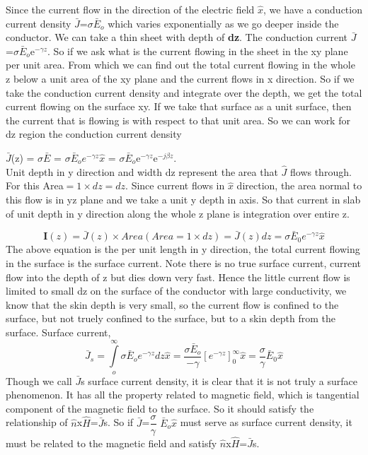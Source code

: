 Since the current flow in the direction of the electric field $\hat{x}$, we have a conduction current density $\bar{J}$=$\sigma\bar{E}_o$ which varies exponentially as we go deeper inside the conductor. We can take a thin sheet with depth of \textbf{dz}. The conduction current $\bar{J}$=$\sigma\bar{E}_o$e$^{-\gamma z}$. So if we ask what is the current flowing in the sheet in the xy plane per unit area. From which we can find out the total current flowing in the whole z below a unit area of the xy plane and the current flows in x direction. So if we take the conduction current density and integrate over the depth, we get the total current flowing on the surface xy. If we take that surface as a unit surface, then the current that is flowing is with respect to that unit area. So we can work for dz region the conduction current density

$\bar{J}$(z) = $\sigma$$\bar{E}$ = $\sigma\bar{E}_oe^{-\gamma z} \hat{x}$ = $\sigma\bar{E}_o$e$^{-\gamma z}$e$^{-j\beta z}$.\\
Unit depth in y direction and width dz represent the area that $\hat{J}$ flows through. For this Area$=1\times dz=dz$. Since current flows in $\hat{x}$ direction, the area normal to this flow is in yz plane and we take a unit y depth in  axis. So that current in slab of unit depth in y direction along the whole z plane is integration over entire z.

\begin{dmath}
\textbf{I}(z)=\bar{J}(z)\times Area (Area=1\times dz)=\bar{J}(z)dz=\sigma\bar{E}_0e^{-\gamma z} \hat{x}
\end{dmath}
The above equation is the per unit length in y direction, the total current flowing in the surface is the surface current. Note there is no true surface current, current flow into the depth of z but dies down very fast. Hence the little current flow is limited to small dz on the surface of the conductor with large conductivity, we know that the skin depth is very small, so the current flow is confined to the surface, but not truely confined to the surface, but to a skin depth from the surface.
Surface current,
\begin{dmath}
\bar{J}_s=\int\limits_o^\infty\sigma\bar{E}_o e^{-\gamma z}dz\hat{x}
=\frac{\sigma\bar{E}_o}{-\gamma}[e^{-\gamma z}]_0^\infty \hat{x}=\frac{\sigma}{\gamma}\bar{E}_0\hat{x}
\end{dmath}
Though we call $\bar{J}$s surface current density, it is clear that it is not truly a surface phenomenon. It has all the property related to magnetic field, which is tangential component of the magnetic field to the surface. So it should satisfy the relationship of $\hat{n}$x$\hat{H}$=$\bar{J}$s. So if 
$\bar{J}$=$\dfrac{\sigma}{\gamma}$
$\bar{E}$$_o$$\hat{x}$ must serve as surface current density, it must be related to the magnetic field and satisfy $\hat{n}$x$\hat{H}$=$\bar{J}$s.

